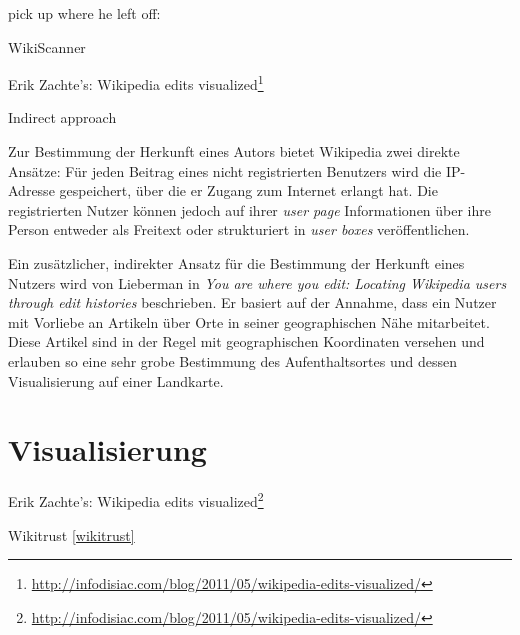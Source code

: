 
\begin{todos}
    \item pick up where he left off: 
    \item WikiScanner
    \item Erik Zachte's: Wikipedia edits visualized\footnote{\url{http://infodisiac.com/blog/2011/05/wikipedia-edits-visualized/}}
    \item Indirect approach 
\end{todos}

Zur Bestimmung der Herkunft eines Autors bietet Wikipedia zwei direkte Ansätze: 
Für jeden Beitrag eines nicht registrierten Benutzers wird die IP-Adresse gespeichert, über die er Zugang zum Internet erlangt hat. 
Die registrierten Nutzer können jedoch auf ihrer \emph{user page} Informationen über ihre Person entweder als Freitext oder strukturiert in \emph{user boxes} veröffentlichen.

Ein zusätzlicher, indirekter Ansatz für die Bestimmung der Herkunft eines Nutzers wird von Lieberman in \emph{You are where you edit: Locating Wikipedia users through edit histories}\cite{lieberman2009you} beschrieben.
Er basiert auf der Annahme, dass ein Nutzer mit Vorliebe an Artikeln über Orte in seiner geographischen Nähe mitarbeitet. 
Diese Artikel sind in der Regel mit geographischen Koordinaten versehen und erlauben so eine sehr grobe Bestimmung des Aufenthaltsortes und dessen Visualisierung auf einer Landkarte.


\section{Visualisierung}\label{sec:visualization}


\begin{todos}
    \item Erik Zachte's: Wikipedia edits visualized\footnote{\url{http://infodisiac.com/blog/2011/05/wikipedia-edits-visualized/}}
    \item Wikitrust \ref{wikitrust}
\end{todos}
